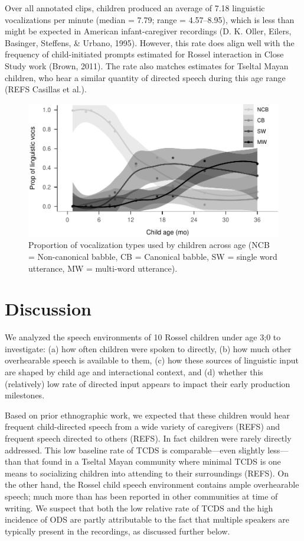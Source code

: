 \documentclass[,man,floatsintext]{apa6}
\begin{document}
Over all annotated clips, children produced an average of 7.18
linguistic vocalizations per minute (median = 7.79; range = 4.57--8.95),
which is less than might be expected in American infant-caregiver
recordings (D. K. Oller, Eilers, Basinger, Steffens, \& Urbano, 1995).
However, this rate does align well with the frequency of child-initiated
prompts estimated for Rossel interaction in Close Study work (Brown,
2011). The rate also matches estimates for Tseltal Mayan children, who
hear a similar quantity of directed speech during this age range (REFS
Casillas et al.).

\begin{figure}
\centering
\includegraphics{Yeli-CLE_files/figure-latex/fig4-1.pdf}
\caption{\label{fig:fig4}Proportion of vocalization types used by children
across age (NCB = Non-canonical babble, CB = Canonical babble, SW =
single word utterance, MW = multi-word utterance).}
\end{figure}

\section{Discussion}\label{disc}

We analyzed the speech environments of 10 Rossel children under age 3;0
to investigate: (a) how often children were spoken to directly, (b) how
much other overhearable speech is available to them, (c) how these
sources of linguistic input are shaped by child age and interactional
context, and (d) whether this (relatively) low rate of directed input
appears to impact their early production milestones.

Based on prior ethnographic work, we expected that these children would
hear frequent child-directed speech from a wide variety of caregivers
(REFS) and frequent speech directed to others (REFS). In fact children
were rarely directly addressed. This low baseline rate of TCDS is
comparable---even slightly less---than that found in a Tseltal Mayan
community where minimal TCDS is one means to socializing children into
attending to their surroundings (REFS). On the other hand, the Rossel
child speech environment contains ample overhearable speech; much more
than has been reported in other communities at time of writing. We
suspect that both the low relative rate of TCDS and the high incidence
of ODS are partly attributable to the fact that multiple speakers are
typically present in the recordings, as discussed further below.
\end{document}
